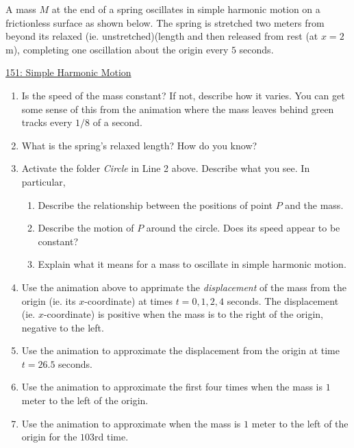 \documentclass{ximera}
\begin{document}
\begin{example}  \label{Ex:LLL}
A mass $M$ at the end of a spring oscillates in simple harmonic motion on a frictionless surface as shown below. The spring is stretched two meters from beyond its relaxed (ie. unstretched)(length and then released from rest (at $x=2$ m), completing one oscillation about the origin every $5$ seconds.

\begin{onlineOnly}
    \begin{center}
\end{center}
\end{onlineOnly}

\href{https://www.desmos.com/calculator/dcba538898}{151: Simple Harmonic Motion}

\begin{enumerate}
\item Is the speed of the mass constant? If not, describe how it varies. You can get some sense of this from the animation where the mass leaves behind green tracks every $1/8$ of a second.

\item What is the spring's relaxed length? How do you know?

\item Activate the folder \emph{Circle} in Line 2 above. Describe what you see. In particular,
\begin{enumerate}
\item Describe the relationship between the positions of point $P$ and the mass.

\item Describe the motion of $P$ around the circle. Does its speed appear to be constant?

\item Explain what it means for a mass to oscillate in simple harmonic motion. 
\end{enumerate}

\item Use the animation above to apprimate the \emph{displacement} of the mass from the origin (ie. its $x$-coordinate) at times $t=0, 1, 2, 4$ seconds. The displacement (ie. $x$-coordinate) is positive when the mass is to the right of the origin, negative to the left. 

\item Use the animation to approximate the displacement from the origin at time $t=26.5$ seconds.

\item Use the animation to approximate the first four times when the mass is $1$ meter to the left of the origin.

\item Use the animation to approximate when the mass is $1$ meter to the left of the origin for the $103$rd time.
\end{enumerate}
\end{example}
\end{document}
